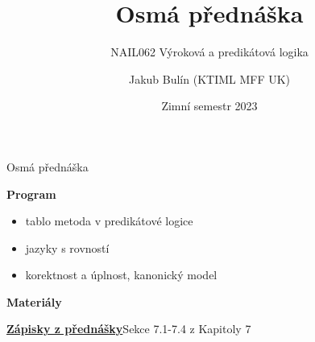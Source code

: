 \documentclass{beamer}
\title{Osmá přednáška}
\subtitle{NAIL062 Výroková a predikátová logika}
\author{Jakub Bulín (KTIML MFF UK)}
\date{Zimní semestr 2023}
\begin{document}
\frame{\titlepage}


\begin{frame}{Osmá přednáška}

    \textbf{Program}
        \begin{itemize}
            \item tablo metoda v predikátové logice
            \item jazyky s rovností
            \item korektnost a úplnost, kanonický model
        \end{itemize}

    \textbf{Materiály}

        \href{https://github.com/jbulin-mff-uk/nail062/raw/main/lecture/lecture-notes/lecture-notes.pdf}{\alert{\textbf{Zápisky z přednášky}}}Sekce 7.1-7.4 z Kapitoly 7

\end{frame}
\end{document}
